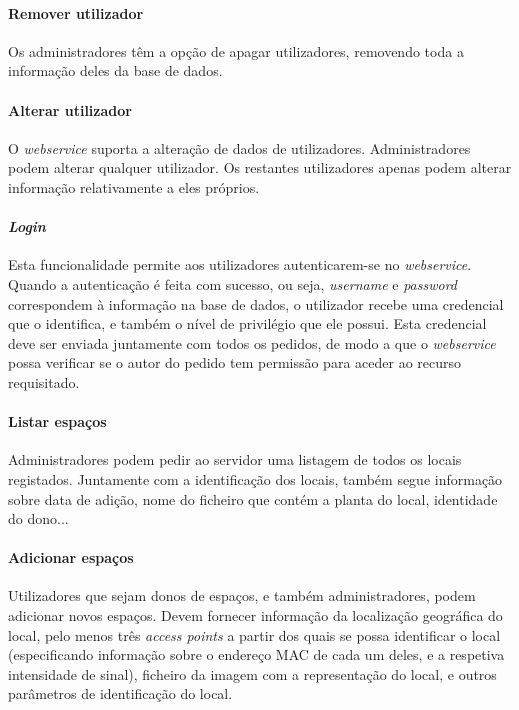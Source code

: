 \documentclass[12pt]{article} %
\begin{document}
\paragraph{Remover utilizador}
Os administradores têm a opção de apagar utilizadores, removendo toda a informação deles da base de dados.\par

\paragraph{Alterar utilizador}
O \textit{webservice} suporta a alteração de dados de utilizadores. Administradores podem alterar qualquer utilizador. Os restantes utilizadores apenas podem alterar informação relativamente a eles próprios.\par

\paragraph{\textit{Login}}
Esta funcionalidade permite aos utilizadores autenticarem-se no \textit{webservice}. Quando a autenticação é feita com sucesso, ou seja, \textit{username} e \textit{password} correspondem à informação na base de dados, o utilizador recebe uma credencial que o identifica, e também o nível de privilégio que ele possui. Esta credencial deve ser enviada juntamente com todos os pedidos, de modo a que o \textit{webservice} possa verificar se o autor do pedido tem permissão para aceder ao recurso requisitado.\par

\paragraph{Listar espaços}
Administradores podem pedir ao servidor uma listagem de todos os locais registados. Juntamente com a identificação dos locais, também segue informação sobre data de adição, nome do ficheiro que contém a planta do local, identidade do dono...\par

\paragraph{Adicionar espaços}
Utilizadores que sejam donos de espaços, e também administradores, podem adicionar novos espaços. Devem fornecer informação da localização geográfica do local, pelo menos três \textit{access points} a partir dos quais se possa identificar o local (especificando informação sobre o endereço MAC de cada um deles, e a respetiva intensidade de sinal), ficheiro da imagem com a representação do local, e outros parâmetros de identificação do local.\par
\end{document}
